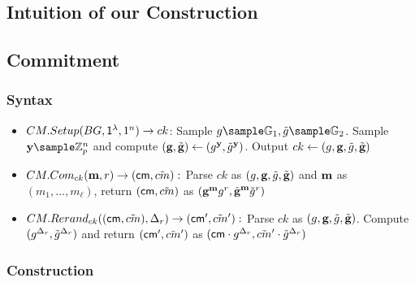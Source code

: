 \subsection{Intuition of our Construction}
\subsection{Commitment}
\subsubsection{Syntax}
\begin{itemize}
    \item $CM.Setup(BG, \mathsf{1^{\lambda}}, 1^n) \to ck$: Sample $g \sample \G_1, \tilg \sample \G_2$. Sample $\yb \sample \Z_p^{n}$ and compute $(\textbf{g}, \tilde{\textbf{g}}) \gets (g^{\textbf{y}}, \tilde{g}^{\textbf{y}})$. Output $ck \gets (g, \textbf{g}, \tilde{g}, \tilde{\textbf{g}})$
    
    \item $CM.Com_{ck}(\textbf{m}, r) \to (\mathsf{cm}, \tilde{cm}):$ Parse $ck$ as $(g, \textbf{g}, \tilde{g}, \tilde{\textbf{g}})$ and $\textbf{m}$ as $(m_1, \dots, m_{\ell})$, return $(\mathsf{cm}, \tilde{cm})$ as $(\textbf{g}^{\textbf{m}}g^r, \tilde{\textbf{g}}^{\textbf{m}}\tilde{g}^r)$

    \item $CM.Rerand_{ck}((\mathsf{cm}, \tilde{cm}), \Delta_r) \to (\mathsf{cm}', \tilde{cm}'):$ Parse $ck$ as $(g, \textbf{g}, \tilde{g}, \tilde{\textbf{g}})$. Compute $(g^{\Delta_r}, \tilde{g}^{\Delta_r})$ and return $(\mathsf{cm}', \tilde{cm}')$ as $(\mathsf{cm} \cdot g^{\Delta_r}, \tilde{cm}' \cdot \tilde{g}^{\Delta_r})$
\end{itemize}

\subsubsection{Construction}

